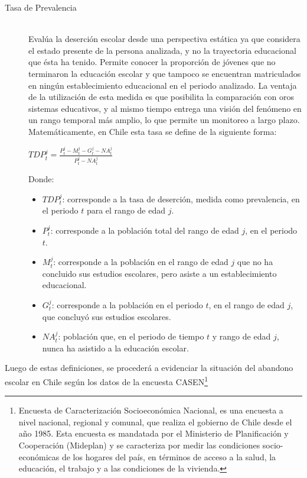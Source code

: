 \begin{description}
\item[Tasa de Prevalencia] \hfill \\
  Evalúa la deserción escolar desde una perspectiva estática ya que considera el estado presente de la persona analizada, y no la trayectoria educacional que ésta ha tenido. Permite conocer la proporción de jóvenes que no terminaron la educación escolar y que tampoco se encuentran matriculados en ningún establecimiento educacional en el periodo analizado.
  La ventaja de la utilización de esta medida es que posibilita la comparación con oros sistemas educativos, y al mismo tiempo entrega una visión del fenómeno en un rango temporal más amplio, lo que permite un monitoreo a largo plazo.
  Matemáticamente, en Chile esta tasa se define de la siguiente forma:\\
   
   \begin{center}
$TDP_t^j = \frac{P_{t}^{j} - M_{t}^{j} - G_{t}^{j} - NA_{t}^{j}}{P_{t}^{j} - NA_{t}^{j}}$
    \end{center}
Donde:
\begin{itemize}[label=]
    \item $TDP_t^j$: corresponde a la tasa de deserción, medida
como prevalencia, en el periodo $t$ para el rango de edad $j$.
    \item $P_{t}^{j}$:  corresponde a la población total del rango de edad $j$, en el periodo $t$.
    \item $M_{t}^{j}$: corresponde a la población en el rango de edad $j$ que no ha concluido sus estudios escolares, pero asiste a un establecimiento educacional.
    \item $G_{t}^{j}$: corresponde a la población en el periodo $t$, en el rango de edad $j$, que concluyó sus estudios escolares.
    \item $NA_{t}^{j}$: población que, en el periodo de tiempo $t$ y rango de edad $j$, nunca ha asistido a la educación escolar.
\end{itemize}
\end{description}

Luego de estas definiciones, se procederá a evidenciar la situación del abandono escolar en Chile según los datos de la encuesta CASEN\footnote{Encuesta de Caracterización Socioeconómica Nacional, es una encuesta a nivel nacional, regional y comunal, que realiza el gobierno de Chile desde el año 1985. Esta encuesta es mandatada por el Ministerio de Planificación y Cooperación (Mideplan) y se caracteriza por medir las condiciones socio-económicas de los hogares del país, en términos de acceso a la salud, la educación, el trabajo y a las condiciones de la vivienda.}

